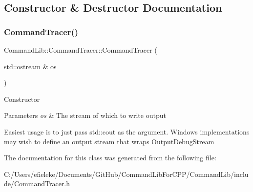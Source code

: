 \subsection{Constructor \& Destructor Documentation}
\mbox{\label{class_command_lib_1_1_command_tracer_a415c9eb7f65bbab0356f6beae82a51bf}} 
\subsubsection{\texorpdfstring{Command\+Tracer()}{CommandTracer()}}
{\footnotesize\ttfamily Command\+Lib\+::\+Command\+Tracer\+::\+Command\+Tracer (\begin{DoxyParamCaption}\item[{std\+::ostream \&}]{os }\end{DoxyParamCaption})\hspace{0.3cm}{\ttfamily [explicit]}}



Constructor


\begin{DoxyParams}{Parameters}
{\em os} & The stream of which to write output\\
\hline
\end{DoxyParams}


Easiest usage is to just pass std\+::cout as the argument. Windows implementations may wish to define an output stream that wraps Output\+Debug\+Stream 

The documentation for this class was generated from the following file\+:\begin{DoxyCompactItemize}
\item 
C\+:/\+Users/efieleke/\+Documents/\+Git\+Hub/\+Command\+Lib\+For\+C\+P\+P/\+Command\+Lib/include/Command\+Tracer.\+h\end{DoxyCompactItemize}
